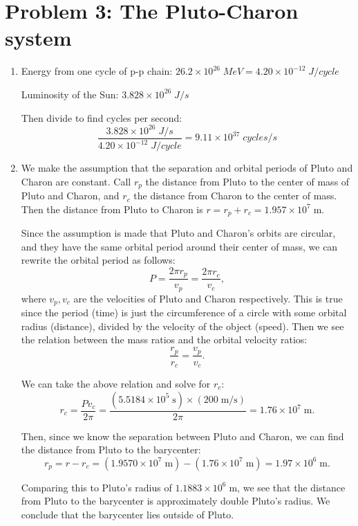 \documentclass[11pt,letterpaper]{article}
\begin{document}
	\section*{Problem 3: The Pluto-Charon system}
	\begin{enumerate}[label=(\alph*)]
		\item 
		Energy from one cycle of p-p chain: $26.2\times 10^{26} \;\si{MeV} = 4.20\times 10^{-12}\;\si{J/cycle}$
		
		Luminosity of the Sun: $3.828 \times 10^{26} \;\si{J/s}$
		
		Then divide to find cycles per second: $$\frac{3.828 \times 10^{26} \;\si{J/s}}{4.20\times 10^{-12}\;\si{J/cycle}} = 9.11\times 10^{37}\;\si{cycles/s}$$
		
		
		\item
		We make the assumption that the separation and orbital periods of Pluto and Charon are constant. Call $r_p$ the distance from Pluto to the center of mass of Pluto and Charon, and $r_c$ the distance from Charon to the center of mass. Then the distance from Pluto to Charon is $r = r_p + r_c = 1.957\times 10^7\;\si{\metre}.$ 
		
		Since the assumption is made that Pluto and Charon's orbits are circular, and  they have the same orbital period around their center of mass, we can rewrite the orbital period as follows: $$P = \frac{2\pi r_p}{v_p} = \frac{2\pi r_c}{v_c},$$ where $v_p, v_c$ are the velocities of Pluto and Charon respectively. This is true since the period (time) is just the circumference of a circle with some orbital radius (distance), divided by the velocity of the object (speed). Then we see the relation between the mass ratios and the orbital velocity ratios: $$\frac{r_p}{r_c} = \frac{v_p}{v_c}.$$
		
		We can take the above relation and solve for $r_c$: $$r_c = \frac{Pv_c}{2\pi} = \frac{(5.5184\times 10^5\;\si{\second}) \times (200\;\si{\meter\per\second})}{2\pi} = 1.76 \times 10^7 \;\si{\meter}.$$
		
		Then, since we know the separation between Pluto and Charon, we can find the distance from Pluto to the barycenter: $$r_p = r - r_c = (1.9570\times 10^7\;\si{\meter}) - (1.76 \times 10^7\;\si{\meter}) = 1.97\times 10^6 \;\si{\meter}.$$
		
		Comparing this to Pluto's radius of $1.1883\times 10^6\;\si{\meter}$, we see that the distance from Pluto to the barycenter is approximately double Pluto's radius. We conclude that the barycenter lies outside of Pluto. 
		
	\end{enumerate}
	
\end{document}
